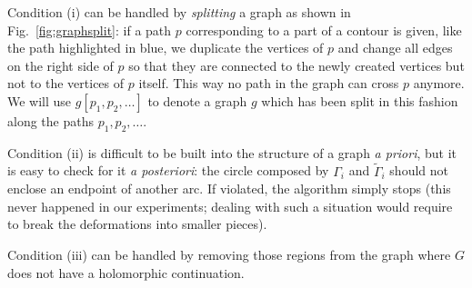 \documentclass[reqno]{amsart}
\begin{document}
Condition (i) can be handled by {\em splitting} a graph as shown in Fig.~\ref{fig:graphsplit}:
if a path $p$ corresponding to a part of a contour is given, like the path highlighted in blue, 
we duplicate the vertices of $p$ and change all edges on the right side of $p$ so that they are 
connected to the newly created vertices but not to the vertices of $p$ itself. 
This way no path in the graph can cross $p$ anymore. We will use $g[p_1,p_2,\dots]$ to denote a graph $g$ which has been split in this fashion along the paths $p_1,p_2,\dots$. 

Condition (ii) is difficult to be built into the structure of a graph {\em a priori}, but it is easy to check for it
{\em a posteriori}: the circle composed by $\Gamma_i$ and $\tilde\Gamma_i$ should not enclose an endpoint of another arc. If violated, the algorithm simply stops (this never happened in our experiments; dealing with such a situation would
require to break the deformations into smaller pieces).

Condition (iii) can be handled by removing those regions from the graph where $G$ does not have a holomorphic continuation. 
\end{document}
